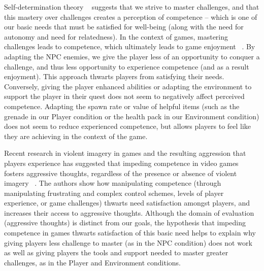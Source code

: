 Self-determination theory ~\cite{ryan2000self} suggests that we strive to master challenges, and that this mastery over challenges creates a perception of competence – which is one of our basic needs that must be satisfied for well-being (along with the need for autonomy and need for relatedness). In the context of games, mastering challenges leads to competence, which ultimately leads to game enjoyment ~\cite{ryan2006motivational}. By adapting the NPC enemies, we give the player less of an opportunity to conquer a challenge, and thus less opportunity to experience competence (and as a result enjoyment). This approach thwarts players from satisfying their needs. Conversely, giving the player enhanced abilities or adapting the environment to support the player in their quest does not seem to negatively affect perceived competence. Adapting the spawn rate or value of helpful items (such as the grenade in our Player condition or the health pack in our Environment condition) does not seem to reduce experienced competence, but allows players to feel like they are achieving in the context of the game.

Recent research in violent imagery in games and the resulting aggression that players experience has suggested that impeding competence in video games fosters aggressive thoughts, regardless of the presence or absence of violent imagery ~\cite{przybylski2013competence}. The authors show how manipulating competence (through manipulating frustrating and complex control schemes, levels of player experience, or game challenges) thwarts need satisfaction amongst players, and increases their access to aggressive thoughts. Although the domain of evaluation (aggressive thoughts) is distinct from our goals, the hypothesis that impeding competence in games thwarts satisfaction of this basic need helps to explain why giving players less challenge to master (as in the NPC condition) does not work as well as giving players the tools and support needed to master greater challenges, as in the Player and Environment conditions.

